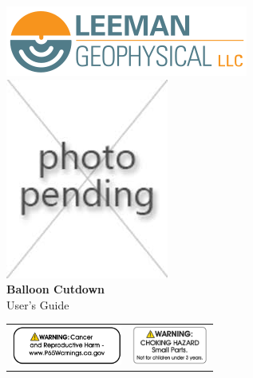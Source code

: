 \documentclass[letter,12pt,oneside,pdflatex,italian,final,twocolumn]{article}
\title{}
\author{}
\date{}
\begin{document}
\pagestyle{fancy}


\cfoot{}

\onecolumn

\begin{center}
	\includegraphics[width=.6\textwidth,center,]{logo.png}\\

	\includegraphics[width=.7\textwidth,center,]{product.jpg}\\
	\Huge \textbf{Balloon Cutdown\\}
	\Large {User's Guide}
\end{center}

\begin{table}[h!]
     \begin{center}
     \begin{tabular}{ p{1.25in}  p{1in} }
     \includegraphics[height=0.5in,center,]{prop65.png} & \includegraphics[height=0.5in,center,]{choking.png} \\
     \end{tabular}
     \end{center}
\end{table}
\small
  
\end{document}
